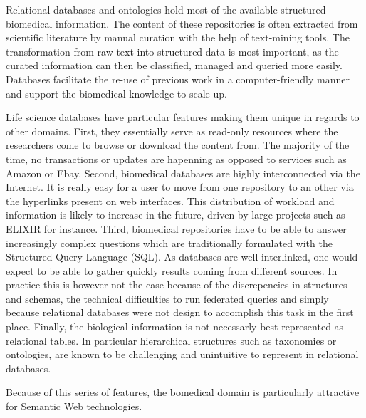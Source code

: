 \documentclass{bioinfo}
\begin{document}
Relational databases and ontologies hold most of the available structured biomedical information. The content of these repositories is often
extracted from scientific literature by manual curation with the help of text-mining tools. The transformation from raw text into
structured data is most important, as the curated information can then be classified, managed and queried more easily. Databases facilitate
the re-use of previous work in a computer-friendly manner and support the biomedical knowledge to scale-up.

Life science databases have particular features making them unique in regards to other domains. First, they essentially serve as read-only 
resources where the researchers come to browse or download the content from. The majority of the time, no transactions or updates 
are hapenning as opposed to services such as Amazon or Ebay. Second, biomedical databases are highly interconnected via the Internet. 
It is really easy for a user to move from one repository to an other via the hyperlinks present on web interfaces. This distribution of workload 
and information is likely to increase in the future, driven by large projects such as ELIXIR for instance.
Third, biomedical repositories have to be able to answer increasingly complex questions which 
are traditionally formulated with the Structured Query Language (SQL). As databases are well interlinked, one would expect to be able to
gather quickly results coming from different sources. In practice this is however not the case because of the discrepencies in 
structures and schemas, the technical difficulties to run federated queries and simply because relational databases were not design to 
accomplish this task in the first place. Finally, the biological information is not necessarly best represented as relational tables. 
In particular hierarchical structures such as taxonomies or ontologies, are known to be challenging and unintuitive to represent in relational 
databases.  

Because of this series of features, the bomedical domain is particularly attractive for Semantic Web technologies. 
\end{document}
